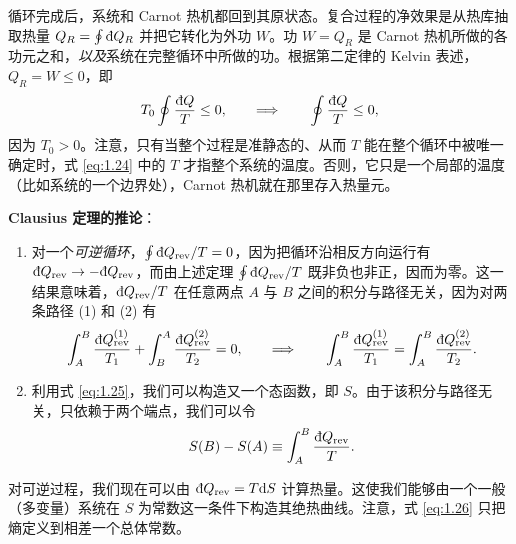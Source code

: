 循环完成后，系统和 Carnot 热机都回到其原状态。复合过程的净效果是从热库抽取热量 $Q_R=\oint\inexd Q_R$ 并把它转化为外功 $W$。功 $W=Q_R$ 是 Carnot 热机所做的各功元之和，\emph{以及}系统在完整循环中所做的功。根据第二定律的 Kelvin 表述，$Q_R=W\le0$，即
\begin{equation}
T_0\oint\frac{\inexd Q}{T}\le0,\qquad\Longrightarrow\qquad\oint\frac{\inexd Q}{T}\le0,
\label{eq:1.24}
\end{equation}
因为 $T_0>0$。注意，只有当整个过程是准静态的、从而 $T$ 能在整个循环中被唯一确定时，式 \eqref{eq:1.24} 中的 $T$ 才指整个系统的温度。否则，它只是一个局部的温度（比如系统的一个边界处），Carnot 热机就在那里存入热量元。


\textbf{Clausius 定理的推论}：

\begin{enumerate}[leftmargin=2.2em, itemsep=0.4em]
  \item 对一个\emph{可逆循环}，$\oint\inexd Q_{\text{rev}}/T=0$，因为把循环沿相反方向运行有 $\inexd Q_{\text{rev}}\to-\inexd Q_{\text{rev}}$，而由上述定理 $\oint\inexd Q_{\text{rev}}/T$ 既非负也非正，因而为零。这一结果意味着，$\inexd Q_{\text{rev}}/T$ 在任意两点 $A$ 与 $B$ 之间的积分与路径无关，因为对两条路径 (1) 和 (2) 有
\begin{equation}
\int_A^B\frac{\inexd Q_{\text{rev}}^{(1)}}{T_1}+\int_B^A\frac{\inexd Q_{\text{rev}}^{(2)}}{T_2}=0,\qquad\Longrightarrow\qquad\int_A^B\frac{\inexd Q_{\text{rev}}^{(1)}}{T_1}=\int_A^B\frac{\inexd Q_{\text{rev}}^{(2)}}{T_2}.
\label{eq:1.25}
\end{equation}


  \item 利用式 \eqref{eq:1.25}，我们可以构造又一个态函数，即 $S$。由于该积分与路径无关，只依赖于两个端点，我们可以令
\begin{equation}
S(B)-S(A)\equiv\int_A^B\frac{\inexd Q_{\text{rev}}}{T}.
\label{eq:1.26}
\end{equation}
\end{enumerate}

对可逆过程，我们现在可以由 $\inexd Q_{\text{rev}}=T\mathrm{d}S$ 计算热量。这使我们能够由一个一般（多变量）系统在 $S$ 为常数这一条件下构造其绝热曲线。注意，式 \eqref{eq:1.26} 只把熵定义到相差一个总体常数。

